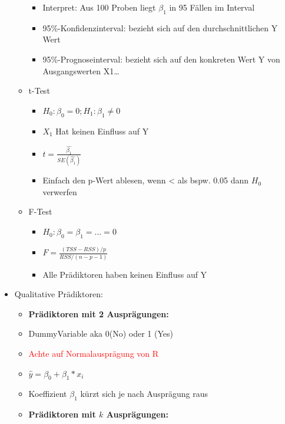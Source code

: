 \documentclass[a4paper]{article}
\begin{document}
\begin{landscape}
\begin{multicols}{3}
\begin{itemize}[noitemsep,nolistsep,leftmargin=*]
\begin{itemize}[noitemsep,nolistsep,leftmargin=*]
\begin{itemize}[noitemsep,nolistsep,leftmargin=*]
                    \item Interpret: Aus 100 Proben liegt $ \beta_1$ in 95 Fällen im Interval
                    \item 95\%-Konfidenzinterval: bezieht sich auf den durchschnittlichen Y Wert
                    \item 95\%-Prognoseinterval: bezieht sich auf den konkreten Wert Y von Ausgangswerten X1\dots
                \end{itemize}
                \item t-Test
                \begin{itemize}[noitemsep,nolistsep,leftmargin=*]
                    \item $H_0: \beta_0 = 0; H_1: \beta_1 \neq 0$
                    \item $X_1$ Hat keinen Einfluss auf Y
                    \item $t = \frac{\hat{\beta_1}}{SE(\hat{\beta_1})}$
                    \item Einfach den p-Wert ablesen, wenn < als bspw. 0.05 dann $H_0$ verwerfen
                \end{itemize}
                \item F-Test
                \begin{itemize}[noitemsep,nolistsep,leftmargin=*]
                    \item $H_0: \beta_0 = \beta_1 = ... = 0$
                    \item $F =\frac{(TSS-RSS)/p}{RSS/(n-p-1)}$
                    \item Alle Prädiktoren haben keinen Einfluss auf Y
                \end{itemize}
            \end{itemize}
            \item Qualitative Prädiktoren:
            \begin{itemize}[noitemsep,nolistsep,leftmargin=*]
                \item \textbf{Prädiktoren mit 2 Ausprägungen:}
                \item DummyVariable aka 0(No) oder 1 (Yes)
                \item \textcolor{red}{Achte auf Normalausprägung von R}
                \item $\hat{y} = \beta_0 + \beta_1*x_i $
                \item Koeffizient $\beta_1$ kürzt sich je nach Ausprägung raus
                \item \textbf{Prädiktoren mit $k$ Ausprägungen:}

\end{itemize}
\end{itemize}
\end{multicols}
\end{landscape}
\end{document}
